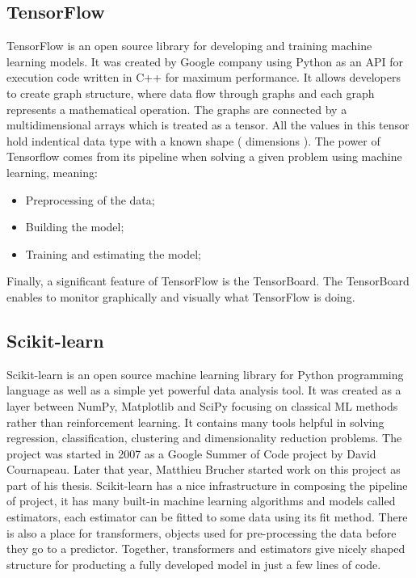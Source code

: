 \documentclass[a4paper,oneside,openright,11pt]{book}
\begin{document}
\subsection{TensorFlow}

TensorFlow \cite{tf} is an open source library for developing and training machine learning models. It was created by Google company using Python as an API for execution code written in C++ for maximum performance. It allows developers to create graph structure, where data flow through graphs and each graph represents a mathematical operation. The graphs are connected by a multidimensional arrays which is treated as a tensor. All the values in this tensor hold indentical data type with a known shape ( dimensions ). The power of Tensorflow comes from its pipeline when solving a given problem using machine learning, meaning:

\begin{itemize}
    \item Preprocessing of the data;
    \item Building the model;
    \item Training and estimating the model;
\end{itemize}

Finally, a significant feature of TensorFlow is the TensorBoard. The TensorBoard enables to monitor graphically and visually what TensorFlow is doing.

\subsection{Scikit-learn}

Scikit-learn \cite{sklearn} is an open source machine learning library for Python programming language as well as a simple yet powerful data analysis tool. It was created as a layer between NumPy, Matplotlib and SciPy focusing on classical ML methods rather than reinforcement learning. It contains many tools helpful in solving regression, classification, clustering and dimensionality reduction problems. The project was started in 2007 as a Google Summer of Code project by David Cournapeau. Later that year, Matthieu Brucher started work on this project as part of his thesis. Scikit-learn has a nice infrastructure in composing the pipeline of project, it has many built-in machine learning algorithms and models called estimators, each estimator can be fitted to some data using its fit method. There is also a place for transformers, objects used for pre-processing the data before they go to a predictor. Together, transformers and estimators give nicely shaped structure for producting a fully developed model in just a few lines of code. 
\end{document}
